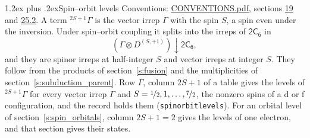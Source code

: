 \documentclass[10pt,a4paper]{article}
\makeatletter
\renewcommand\section{\@startsection{section}{1}{\z@}{-3ex plus -1ex minus -.2ex}%
  {1.2ex plus .2ex}{\normalfont\large\sffamily\bfseries\color{parttitle}}}
\numberwithin{equation}{section}
\newcommand{\grp}[1]{\mathsf{#1}}
\newcommand{\restr}[2]{#1\!\downarrow#2}
\newcommand{\irrJp}[2]{D^{(#1,#2)}}
\newcommand{\irrprod}{\otimes}
\newcommand{\term}[2]{{}^{#1}#2}
\makeatother
\begin{document}
\section{Spin--orbit levels}\label{s:spin_orbit}
Conventions: \href{../../CONVENTIONS.pdf}{CONVENTIONS.pdf}, sections \href{../../../rotation/CONVENTIONS.pdf\#conv.19}{19} and \href{../../CONVENTIONS.pdf\#conv.25.2}{25.2}.
\leavevmode\label{n:local.spin}\label{n:symbol.term}A term $\term{2S+1}{\Gamma}$ is the vector irrep $\Gamma$ with the spin $S$, a spin even under the inversion. Under spin--orbit coupling it splits into the irreps of $\grp{2C_{6}}$ in
\begin{equation}\label{e:spinorbit}\restr{(\Gamma \irrprod \irrJp{S}{+1})}{\grp{2C_{6}}},\end{equation}
and they are spinor irreps at half-integer $S$ and vector irreps at integer $S$. They follow from the products of section~\ref{s:fusion} and the multiplicities of section~\ref{s:subduction_parent}. Row $\Gamma$, column $2S + 1$ of a table gives the levels of $\term{2S+1}{\Gamma}$ for every vector irrep $\Gamma$ and $S = \nicefrac{1}{2}, 1, \dots, \nicefrac{7}{2}$, the nonzero spins of a d or f configuration, and the record holds them (\texttt{spinorbitlevels}). For an orbital level of section~\ref{s:spin_orbitals}, column $2S + 1 = 2$ gives the levels of one electron, and that section gives their states.
\end{document}
